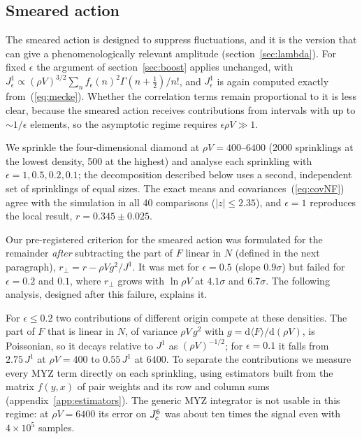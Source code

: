 \documentclass{iopjournal}
\newcommand{\eref}[1]{(\ref{#1})}
\newcommand{\rmd}{\mathrm{d}}
\newcommand{\rhoV}{\rho V}
\newcommand{\Jone}{J^{1}}
\begin{document}
\subsection{Smeared action}
\label{sec:smeared}

The smeared action is designed to suppress fluctuations, and it is the
version that can give a phenomenologically relevant amplitude
(section~\ref{sec:lambda}). For fixed $\epsilon$ the argument of
section~\ref{sec:boost} applies unchanged, with
$\Jone_\epsilon\propto(\rhoV)^{3/2}\sum_nf_\epsilon(n)^2\Gamma(n+\frac12)/n!$,
and $\Jone_\epsilon$ is again computed exactly from~\eref{eq:mecke}. Whether
the correlation terms remain proportional to it is less clear, because the
smeared action receives contributions from intervals with up to
$\sim1/\epsilon$ elements, so the asymptotic regime requires
$\epsilon\rhoV\gg1$.

We sprinkle the four-dimensional diamond at $\rhoV=400$--$6400$ (2000
sprinklings at the lowest density, 500 at the highest) and analyse each
sprinkling with $\epsilon=1,0.5,0.2,0.1$; the decomposition described below
uses a second, independent set of sprinklings of equal sizes. The exact means and covariances~\eref{eq:covNF}
agree with the simulation in all 40 comparisons ($|z|\le2.35$), and
$\epsilon=1$ reproduces the local result, $r=0.345\pm0.025$.

Our pre-registered criterion for the smeared action was formulated for the
remainder \emph{after} subtracting the part of $F$ linear in $N$ (defined in
the next paragraph), $r_\perp=r-\rhoV g^2/\Jone$. It was met for $\epsilon=0.5$ (slope
$0.9\sigma$) but failed for $\epsilon=0.2$ and $0.1$, where $r_\perp$ grows
with $\ln\rhoV$ at $4.1\sigma$ and $6.7\sigma$. The following analysis,
designed after this failure, explains it.

For $\epsilon\le0.2$ two contributions of different origin compete at these
densities. The part of $F$ that is linear in $N$, of variance
$\rhoV\,g^2$ with $g=\rmd\langle F\rangle/\rmd(\rhoV)$, is Poissonian, so it
decays relative to $\Jone$ as $(\rhoV)^{-1/2}$; for $\epsilon=0.1$ it falls
from $2.75\,\Jone$ at $\rhoV=400$ to $0.55\,\Jone$ at $6400$. To separate the
contributions we measure every MYZ term directly on each sprinkling, using
estimators built from the matrix $f(y,x)$ of pair weights and its row and
column sums (appendix~\ref{app:estimators}). The generic MYZ integrator is not usable
in this regime: at $\rhoV=6400$ its error on $J^6_{\rm c}$ was about ten times
the signal even with $4\times10^5$ samples.
\end{document}
